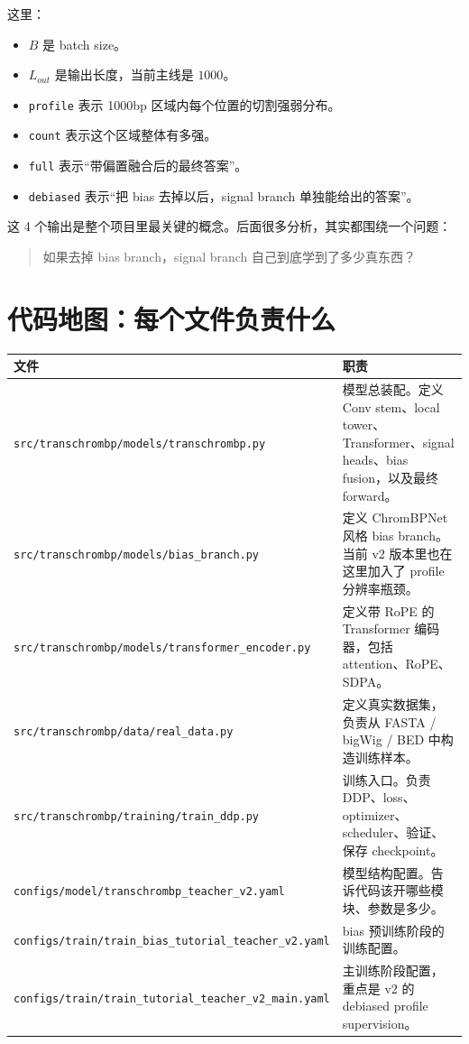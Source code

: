 \documentclass[11pt,a4paper]{ctexart}
\begin{document}
这里：

\begin{itemize}[leftmargin=2em]
\item $B$ 是 batch size。
\item $L_{out}$ 是输出长度，当前主线是 $1000$。
\item \texttt{profile} 表示 1000bp 区域内每个位置的切割强弱分布。
\item \texttt{count} 表示这个区域整体有多强。
\item \texttt{full} 表示“带偏置融合后的最终答案”。
\item \texttt{debiased} 表示“把 bias 去掉以后，signal branch 单独能给出的答案”。
\end{itemize}

这 4 个输出是整个项目里最关键的概念。后面很多分析，其实都围绕一个问题：

\begin{quote}
如果去掉 bias branch，signal branch 自己到底学到了多少真东西？
\end{quote}

\section{代码地图：每个文件负责什么}

\begin{longtable}{p{} p{}}
\toprule
\textbf{文件} & \textbf{职责} \\
\midrule
\endhead
\texttt{src/transchrombp/models/transchrombp.py} & 模型总装配。定义 Conv stem、local tower、Transformer、signal heads、bias fusion，以及最终 forward。 \\
\texttt{src/transchrombp/models/bias\_branch.py} & 定义 ChromBPNet 风格 bias branch。当前 v2 版本里也在这里加入了 profile 分辨率瓶颈。 \\
\texttt{src/transchrombp/models/transformer\_encoder.py} & 定义带 RoPE 的 Transformer 编码器，包括 attention、RoPE、SDPA。 \\
\texttt{src/transchrombp/data/real\_data.py} & 定义真实数据集，负责从 FASTA / bigWig / BED 中构造训练样本。 \\
\texttt{src/transchrombp/training/train\_ddp.py} & 训练入口。负责 DDP、loss、optimizer、scheduler、验证、保存 checkpoint。 \\
\texttt{configs/model/transchrombp\_teacher\_v2.yaml} & 模型结构配置。告诉代码该开哪些模块、参数是多少。 \\
\texttt{configs/train/train\_bias\_tutorial\_teacher\_v2.yaml} & bias 预训练阶段的训练配置。 \\
\texttt{configs/train/train\_tutorial\_teacher\_v2\_main.yaml} & 主训练阶段配置，重点是 v2 的 debiased profile supervision。 \\
\bottomrule
\end{longtable}
\end{document}
